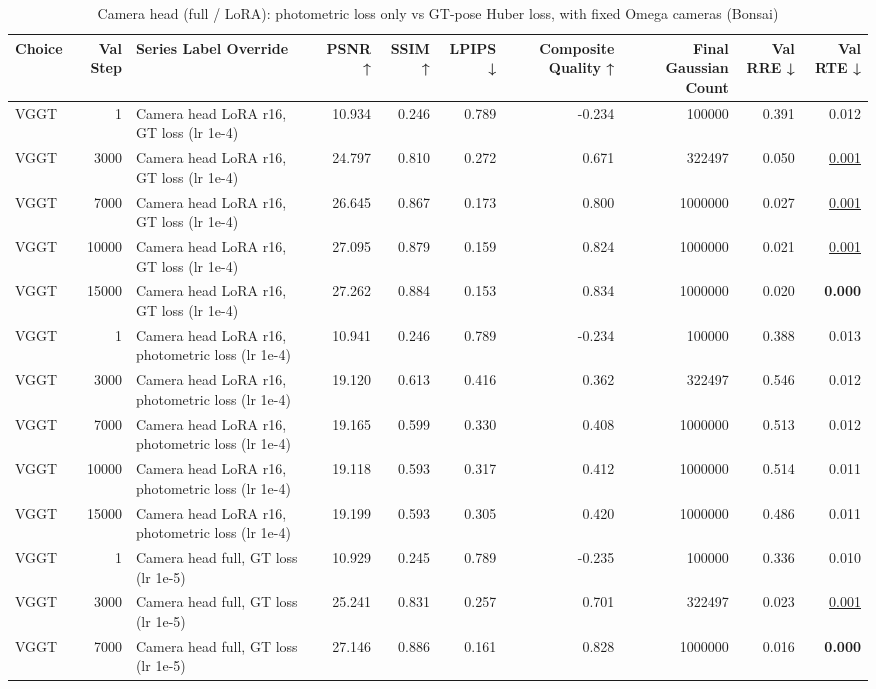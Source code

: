 \begin{table}[H]
\caption{\ifdefined\customcaption \customcaption \else Camera head (full / LoRA): photometric loss only vs GT-pose Huber loss, with fixed Omega cameras (Bonsai) \fi}
\label{tab:109_omega_photo_vs_gt_heads_bonsai}
\centering
\tiny
\begin{tabular}{lrlrrrrrrr}
\toprule
Choice & Val Step & Series Label Override & PSNR ↑ & SSIM ↑ & LPIPS ↓ & Composite Quality ↑ & Final Gaussian Count & Val RRE ↓ & Val RTE ↓ \\
\midrule
VGGT & 1 & Camera head LoRA r16, GT loss (lr 1e-4) & 10.934 & 0.246 & 0.789 & -0.234 & 100000 & 0.391 & 0.012 \\
VGGT & 3000 & Camera head LoRA r16, GT loss (lr 1e-4) & 24.797 & 0.810 & 0.272 & 0.671 & 322497 & 0.050 & \underline{0.001} \\
VGGT & 7000 & Camera head LoRA r16, GT loss (lr 1e-4) & 26.645 & 0.867 & 0.173 & 0.800 & 1000000 & 0.027 & \underline{0.001} \\
VGGT & 10000 & Camera head LoRA r16, GT loss (lr 1e-4) & 27.095 & 0.879 & 0.159 & 0.824 & 1000000 & 0.021 & \underline{0.001} \\
VGGT & 15000 & Camera head LoRA r16, GT loss (lr 1e-4) & 27.262 & 0.884 & 0.153 & 0.834 & 1000000 & 0.020 & \textbf{0.000} \\
VGGT & 1 & Camera head LoRA r16, photometric loss (lr 1e-4) & 10.941 & 0.246 & 0.789 & -0.234 & 100000 & 0.388 & 0.013 \\
VGGT & 3000 & Camera head LoRA r16, photometric loss (lr 1e-4) & 19.120 & 0.613 & 0.416 & 0.362 & 322497 & 0.546 & 0.012 \\
VGGT & 7000 & Camera head LoRA r16, photometric loss (lr 1e-4) & 19.165 & 0.599 & 0.330 & 0.408 & 1000000 & 0.513 & 0.012 \\
VGGT & 10000 & Camera head LoRA r16, photometric loss (lr 1e-4) & 19.118 & 0.593 & 0.317 & 0.412 & 1000000 & 0.514 & 0.011 \\
VGGT & 15000 & Camera head LoRA r16, photometric loss (lr 1e-4) & 19.199 & 0.593 & 0.305 & 0.420 & 1000000 & 0.486 & 0.011 \\
VGGT & 1 & Camera head full, GT loss (lr 1e-5) & 10.929 & 0.245 & 0.789 & -0.235 & 100000 & 0.336 & 0.010 \\
VGGT & 3000 & Camera head full, GT loss (lr 1e-5) & 25.241 & 0.831 & 0.257 & 0.701 & 322497 & 0.023 & \underline{0.001} \\
VGGT & 7000 & Camera head full, GT loss (lr 1e-5) & 27.146 & 0.886 & 0.161 & 0.828 & 1000000 & 0.016 & \textbf{0.000} \\

\end{tabular}
\end{table}
